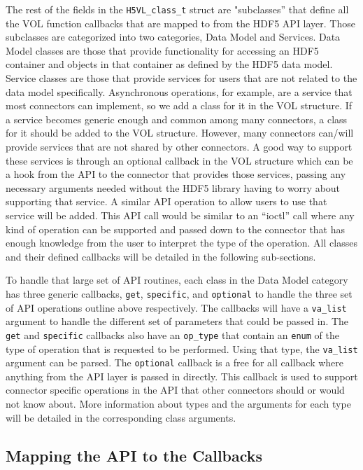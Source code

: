 The rest of the fields in the \texttt{H5VL\_class\_t} struct are "subclasses'' that define all the VOL function callbacks that
are mapped to from the HDF5 API layer. Those subclasses are categorized into two categories, Data Model and Services. Data Model classes are those that provide functionality for accessing an HDF5 container and objects in that container as defined by the HDF5 data model.  Service classes are those that provide services for users that are not related to the data model specifically. Asynchronous operations, for example, are a service that most connectors can implement, so we add a class for it in the VOL structure. If a service becomes generic enough and common among many connectors, a class for it should be added to the VOL structure. However, many connectors can/will provide services that are not shared by other connectors. A good way to support these services is through an optional callback in the VOL structure which can be a hook from the API to the connector that provides those services, passing any necessary arguments needed without the HDF5 library having to worry about supporting that service. A similar API operation to allow users to use that service will be added. This API call would be similar to an “ioctl” call where any kind of operation can be supported and passed down to the connector that has enough knowledge from the user to interpret the type of the operation. All classes and their defined callbacks will be detailed in the following sub-sections.

To handle that large set of API routines, each class in the Data Model category has three generic callbacks, \texttt{get}, \texttt{specific}, and \texttt{optional} to handle the three set of API operations outline above respectively. The callbacks will have a \texttt{va\_list} argument to handle the different set of parameters that could be passed in.  The \texttt{get} and \texttt{specific} callbacks also have an \texttt{op\_type} that contain an \texttt{enum} of the type of operation that is requested to be performed. Using that type, the \texttt{va\_list} argument can be parsed. The \texttt{optional} callback is a free for all callback where anything from the API layer is passed in directly. This callback is used to support connector specific operations in the API that other connectors should or would not know about. More information about types and the arguments for each type will be detailed in the corresponding class arguments.

\subsection{Mapping the API to the Callbacks}
\label{sec:map}

